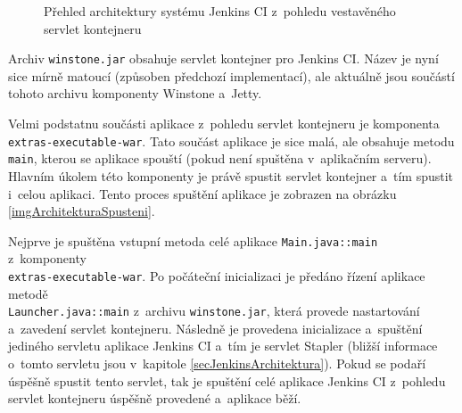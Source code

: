             \begin{figure}[h!t]
                \begin{center}
                    \caption{Přehled architektury systému Jenkins CI z~pohledu vestavěného servlet kontejneru}
                    \label{imgArchitekturaServlet}
                \end{center}
            \end{figure}

            
            Archiv \texttt{winstone.jar} obsahuje servlet kontejner pro Jenkins CI. Název je nyní sice mírně matoucí
            (způsoben předchozí implementací), ale aktuálně jsou součástí tohoto archivu komponenty Winstone a~Jetty.

            Velmi podstatnu součásti aplikace z~pohledu servlet kontejneru je komponenta\\\texttt{extras-executable-war}. 
            Tato součást aplikace je sice malá, ale obsahuje metodu \texttt{main}, kterou se aplikace spouští 
            (pokud není spuštěna v~aplikačním serveru). Hlavním úkolem této komponenty je právě spustit 
            servlet kontejner a~tím spustit i~celou aplikaci. Tento proces spuštění aplikace je zobrazen
            na obrázku \ref{imgArchitekturaSpusteni}.

            Nejprve je spuštěna vstupní metoda celé aplikace \texttt{Main.java::main} z~komponenty\\\texttt{extras-executable-war}.
            Po počáteční inicializaci je předáno řízení aplikace metodě \\\texttt{Launcher.java::main}
            z~archivu \texttt{winstone.jar}, která provede nastartování
            a~zavedení servlet kontejneru. Následně je provedena inicializace a~spuštění
            jediného servletu aplikace Jenkins CI a~tím je servlet Stapler (bližší informace o~tomto
            servletu jsou v~kapitole \ref{secJenkinsArchitektura}). 
            Pokud se podaří úspěšně spustit tento servlet, tak je spuštění celé aplikace Jenkins CI z~pohledu
            servlet kontejneru úspěšně provedené a~aplikace běží.

